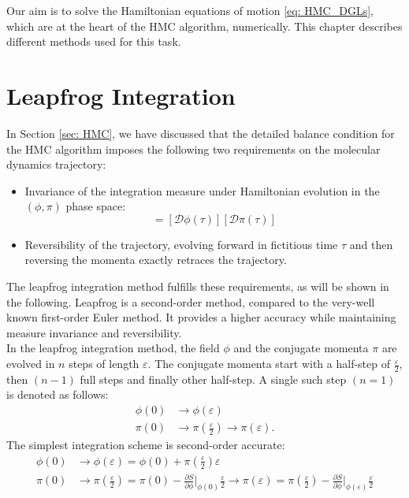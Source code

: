 Our aim is to solve the Hamiltonian equations of motion \ref{eq: HMC_DGLs}, which are at the heart of the HMC algorithm, numerically. This chapter 
describes different methods used for this task. 
\section{Leapfrog Integration}
In Section \ref{sec: HMC}, we have discussed that the detailed balance condition for the HMC algorithm imposes the following two 
requirements on the molecular dynamics trajectory: 
\begin{itemize}
    \item Invariance of the integration measure under Hamiltonian evolution in the $(\phi, \pi)$ phase space: 
    \begin{equation}
        [\mathcal{D}\phi] [\mathcal{D}\pi] = [\mathcal{D}\phi(\tau)] [\mathcal{D}\pi(\tau)]
    \end{equation}
    \item Reversibility of the trajectory, evolving forward in fictitious time $\tau$ and then reversing the momenta exactly retraces the trajectory.
\end{itemize}
The leapfrog integration method fulfills these requirements, as will be shown in the following. Leapfrog is a second-order method, compared to the very-well known first-order Euler method. It provides a higher accuracy while maintaining measure invariance and reversibility.  
\\
In the leapfrog integration method, the field $\phi$ and the conjugate momenta $\pi$ are evolved in $n$ steps of length $\varepsilon$. The conjugate momenta start with a half-step of $\frac{\varepsilon}{2}$, then $(n-1)$ full steps and finally other half-step. A single such step $(n = 1)$ is denoted as follows: 
\begin{align}
    \phi(0) &\rightarrow \phi(\varepsilon) \\
    \pi(0) &\rightarrow \pi(\frac{\varepsilon}{2}) \rightarrow \pi(\varepsilon). 
\end{align}
The simplest integration scheme is second-order accurate: 
\begin{align}\label{eq: leapfrog_scheme}
    \phi(0) &\rightarrow \phi(\varepsilon) = \phi(0) + \pi(\frac{\varepsilon}{2}) \varepsilon \\
    \pi(0) &\rightarrow \pi(\frac{\varepsilon}{2}) = \pi(0) - \frac{\partial S}{\partial \phi}\vert_{\phi(0)}\frac{\varepsilon}{2} \rightarrow \pi(\varepsilon) = \pi(\frac{\varepsilon}{2}) - \frac{\partial S}{\partial \phi} \vert_{\phi(\varepsilon)}\frac{\varepsilon}{2}
\end{align}
